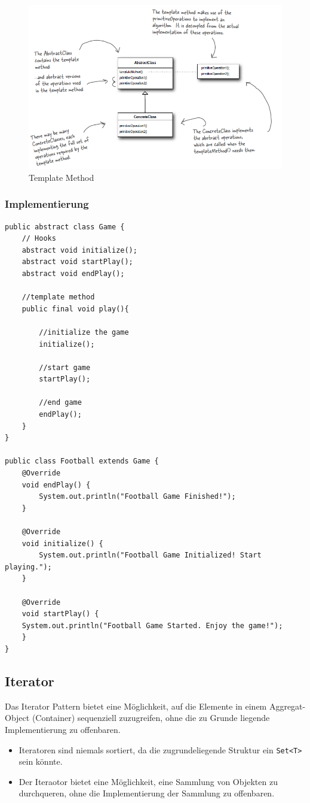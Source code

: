 \begin{figure}[h]
	\centering
	\includegraphics[width=0.7\linewidth]{images/template_method_pattern}
	\caption{Template Method}
	\label{fig:templatemethod}
\end{figure}

\subsubsection{Implementierung}
\begin{lstlisting}
public abstract class Game {
	// Hooks
	abstract void initialize();
	abstract void startPlay();
	abstract void endPlay();
	
	//template method
	public final void play(){
	
		//initialize the game
		initialize();
		
		//start game
		startPlay();
		
		//end game
		endPlay();
	}
}

public class Football extends Game {
	@Override
	void endPlay() {
		System.out.println("Football Game Finished!");
	}

	@Override
	void initialize() {
		System.out.println("Football Game Initialized! Start playing.");
	}

	@Override
	void startPlay() {
	System.out.println("Football Game Started. Enjoy the game!");
	}
}
\end{lstlisting}



\clearpage


\subsection{Iterator}
\label{sec:iterator}
Das Iterator Pattern bietet eine Möglichkeit, auf die Elemente in einem Aggregat-Object (Container) sequenziell zuzugreifen, ohne die zu Grunde liegende Implementierung zu offenbaren.
\begin{itemize}
	\item Iteratoren sind niemals sortiert, da die zugrundeliegende Struktur ein \lstinline|Set<T>| sein könnte. 
	\item Der Iteraotor bietet eine Möglichkeit, eine Sammlung von Objekten zu durchqueren, ohne die Implementierung der Sammlung zu offenbaren.
\end{itemize}

